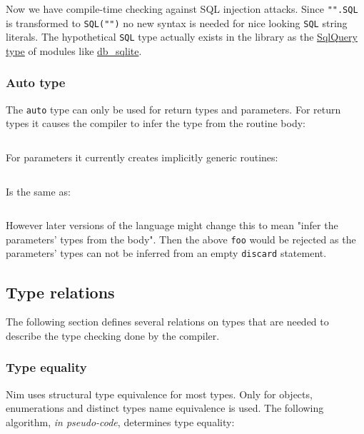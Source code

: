 Now we have compile-time checking against SQL injection attacks. Since
\texttt{"".SQL} is transformed to \texttt{SQL("")} no new syntax is
needed for nice looking \texttt{SQL} string literals. The hypothetical
\texttt{SQL} type actually exists in the library as the
\href{db_common.html\#SqlQuery}{SqlQuery type} of modules like
\href{db_sqlite.html}{db\_sqlite}.

\hypertarget{auto-type}{%
\subsubsection{Auto type}\label{auto-type}}

The \texttt{auto} type can only be used for return types and parameters.
For return types it causes the compiler to infer the type from the
routine body:

\begin{verbatim}
\end{verbatim}

For parameters it currently creates implicitly generic routines:

\begin{verbatim}
\end{verbatim}

Is the same as:

\begin{verbatim}
\end{verbatim}

However later versions of the language might change this to mean "infer
the parameters' types from the body". Then the above \texttt{foo} would
be rejected as the parameters' types can not be inferred from an empty
\texttt{discard} statement.

\hypertarget{type-relations}{%
\subsection{Type relations}\label{type-relations}}

The following section defines several relations on types that are needed
to describe the type checking done by the compiler.

\hypertarget{type-equality}{%
\subsubsection{Type equality}\label{type-equality}}

Nim uses structural type equivalence for most types. Only for objects,
enumerations and distinct types name equivalence is used. The following
algorithm, \emph{in pseudo-code}, determines type equality:

